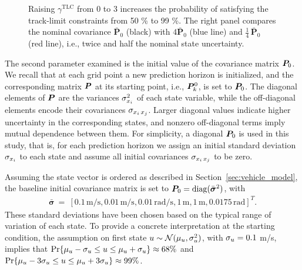 \begin{figure}
{Raising $\gamma^{\mathrm{TLC}}$ from 0 to 3 increases the probability of satisfying the track-limit constraints from 50 \% to 99 \%.
The right panel compares the nominal covariance $\bar{\mathbf P}_{0}$ (black) with $4\bar{\mathbf P}_{0}$ (blue line) and $\tfrac14\,\bar{\mathbf P}_{0}$ (red line), i.e., twice and half the nominal state uncertainty.
}
	\label{fig:ol_sensitivities}
\end{figure}

The second parameter examined is the initial value of the covariance matrix $\boldsymbol{P}_0$.
We recall that at each grid point a new prediction horizon is initialized, and the corresponding matrix $\boldsymbol{P}$ at its starting point, i.e., $\boldsymbol{P}^0_k$, is set to $\boldsymbol{P}_0$.
The diagonal elements of $\boldsymbol{P}$ are the variances $\sigma_{x_i}^2$  of each state variable, while the off-diagonal elements encode their covariances $\sigma_{x_i\,x_j}$. Larger diagonal values indicate higher uncertainty in the corresponding states, and nonzero off-diagonal terms imply mutual dependence between them. For simplicity, a diagonal $\boldsymbol{P}_0$ is used in this study, that is, for each prediction horizon we assign an initial standard deviation $\sigma_{x_i}$ to each state and assume all initial covariances $\sigma_{x_i\,x_j}$  to be zero.

 Assuming the state vector is ordered as described in Section~\ref{sec:vehicle_model}, the baseline initial covariance matrix is set to $\boldsymbol{P}_0=\operatorname{diag}(\bar{\boldsymbol{\sigma}}^2)$, with
\begin{align}
\bar{\boldsymbol{\sigma}}~=~\left[0.1\,\textrm{m/s}, 0.01\,\textrm{m/s}, 0.01\,\textrm{rad/s}, 1\,\textrm{m}, 1\,\textrm{m}, 0.0175\,\textrm{rad}\right]^T.
\end{align}
These standard deviations have been chosen based on the typical range of variation of each state. To provide a concrete interpretation at the starting condition, the assumption on first state $u \sim \mathcal{N}(\mu_u,\sigma_u^2)$, with $\sigma_u=0.1$ m/s, implies that
$\Pr\{\mu_u-\sigma_u \leq u \leq \mu_u+\sigma_u\}\approx 68\%$ and $\Pr\{\mu_u-3\sigma_u \leq u \leq \mu_u+3\sigma_u\}\approx 99\%$.

